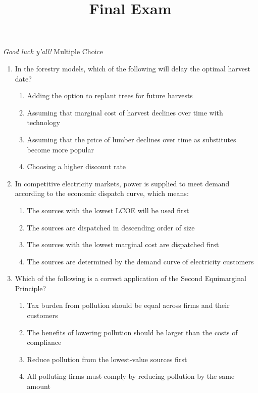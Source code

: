 \documentclass[11pt]{article}
\title{Final Exam}
\newcommand{\answer}[1]{\iftoggle{INCLUDEANSWERS}{{\color{violet!70!white}\textbf{Solution:} #1}}{} }
\newcommand{\points}[1]{\iftoggle{INCLUDEPOINTS}{{\color{blue!70!white}(#1 pts.)}}{}}
\begin{document}
  
\emph{Good luck y'all!}
\vspace*{5mm}
Multiple Choice

\begin{enumerate}
  \item \points{5} In the forestry models, which of the following will delay the optimal harvest date?
  \begin{enumerate}
    \item Adding the option to replant trees for future harvests
    \item Assuming that marginal cost of harvest declines over time with technology
    \item Assuming that the price of lumber declines over time as substitutes become more popular
    \item Choosing a higher discount rate
  \end{enumerate}

  \answer{(b)}

  \item \points{5} In competitive electricity markets, power is supplied to meet demand according to the economic dispatch curve, which means:
  \begin{enumerate}
    \item The sources with the lowest LCOE will be used first
    \item The sources are dispatched in descending order of size
    \item The sources with the lowest marginal cost are dispatched first
    \item The sources are determined by the demand curve of electricity customers
  \end{enumerate}

  \answer{(c)}

  \item \points{5} Which of the following is a correct application of the Second Equimarginal Principle?
  \begin{enumerate}
    \item Tax burden from pollution should be equal across firms and their customers
    \item The benefits of lowering pollution should be larger than the costs of compliance
    \item Reduce pollution from the lowest-value sources first
    \item All polluting firms must comply by reducing pollution by the same amount
  \end{enumerate}

  \answer{(c)}
\end{enumerate}
\end{document}
